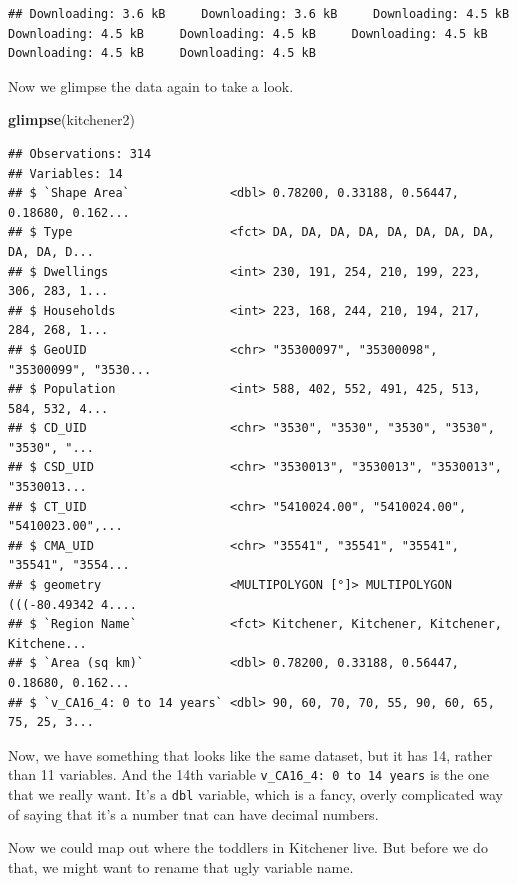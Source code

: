 \documentclass[
]{article}
\newenvironment{Shaded}{\begin{snugshade}}{\end{snugshade}}
\newcommand{\KeywordTok}[1]{\textcolor[rgb]{0.13,0.29,0.53}{\textbf{#1}}}
\newcommand{\NormalTok}[1]{#1}
\begin{document}
\begin{verbatim}
## Downloading: 3.6 kB     Downloading: 3.6 kB     Downloading: 4.5 kB     Downloading: 4.5 kB     Downloading: 4.5 kB     Downloading: 4.5 kB     Downloading: 4.5 kB     Downloading: 4.5 kB
\end{verbatim}

Now we glimpse the data again to take a look.

\begin{Shaded}
\begin{Highlighting}[]
\KeywordTok{glimpse}\NormalTok{(kitchener2)}
\end{Highlighting}
\end{Shaded}

\begin{verbatim}
## Observations: 314
## Variables: 14
## $ `Shape Area`              <dbl> 0.78200, 0.33188, 0.56447, 0.18680, 0.162...
## $ Type                      <fct> DA, DA, DA, DA, DA, DA, DA, DA, DA, DA, D...
## $ Dwellings                 <int> 230, 191, 254, 210, 199, 223, 306, 283, 1...
## $ Households                <int> 223, 168, 244, 210, 194, 217, 284, 268, 1...
## $ GeoUID                    <chr> "35300097", "35300098", "35300099", "3530...
## $ Population                <int> 588, 402, 552, 491, 425, 513, 584, 532, 4...
## $ CD_UID                    <chr> "3530", "3530", "3530", "3530", "3530", "...
## $ CSD_UID                   <chr> "3530013", "3530013", "3530013", "3530013...
## $ CT_UID                    <chr> "5410024.00", "5410024.00", "5410023.00",...
## $ CMA_UID                   <chr> "35541", "35541", "35541", "35541", "3554...
## $ geometry                  <MULTIPOLYGON [°]> MULTIPOLYGON (((-80.49342 4....
## $ `Region Name`             <fct> Kitchener, Kitchener, Kitchener, Kitchene...
## $ `Area (sq km)`            <dbl> 0.78200, 0.33188, 0.56447, 0.18680, 0.162...
## $ `v_CA16_4: 0 to 14 years` <dbl> 90, 60, 70, 70, 55, 90, 60, 65, 75, 25, 3...
\end{verbatim}

Now, we have something that looks like the same dataset, but it has 14,
rather than 11 variables. And the 14th variable
\texttt{v\_CA16\_4:\ 0\ to\ 14\ years} is the one that we really want.
It's a \texttt{dbl} variable, which is a fancy, overly complicated way
of saying that it's a number tnat can have decimal numbers.

Now we could map out where the toddlers in Kitchener live. But before we
do that, we might want to rename that ugly variable name.
\end{document}
